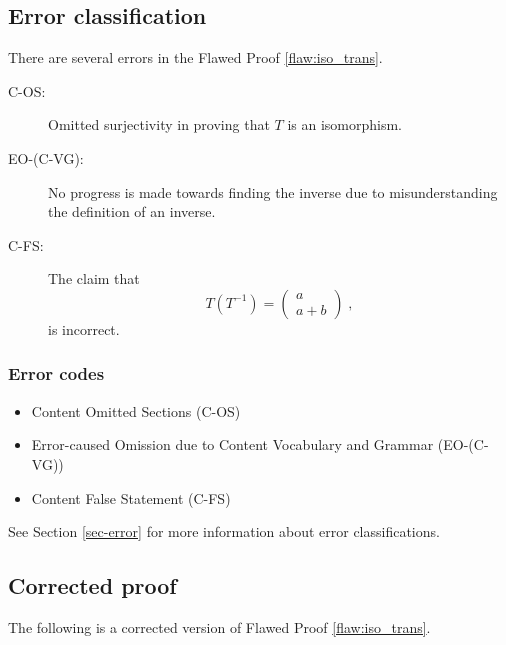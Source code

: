 \clearpage
\subsection{Error classification}


There are several errors
 in the Flawed Proof \ref{flaw:iso_trans}. %


 \begin{description}
 	\item[C-OS:] Omitted surjectivity in proving that $T$ is an isomorphism.
 	\item[EO-(C-VG):] No progress is made towards finding the inverse due to misunderstanding the definition of an inverse.
 	\item[C-FS:] The claim that $$T(T^{-1}) = \begin{pmatrix} a \\ a + b \end{pmatrix}\;,$$
 	is incorrect.
 \end{description}


\subsubsection{Error codes}
\begin{itemize}
	\item 	Content Omitted Sections (C-OS)
	\item   Error-caused Omission due to Content Vocabulary and Grammar (EO-(C-VG))
	\item   Content False Statement (C-FS)
\end{itemize}
See Section \ref{sec-error} for more information about error classifications.

\clearpage
\subsection{Corrected proof}

The following is a corrected version of Flawed Proof \ref{flaw:iso_trans}. %

